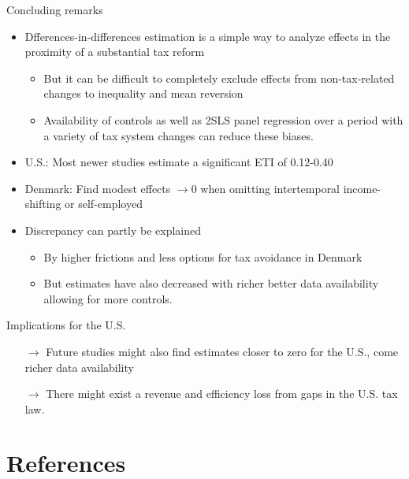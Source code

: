 \documentclass[8pt]{beamer}
\begin{document}
\begin{frame}{Concluding remarks}
  \begin{itemize}
    \item Dfferences-in-differences estimation is a simple way to analyze effects in the proximity of a substantial tax reform
    \begin{itemize}
      \item But it can be difficult to completely exclude effects from non-tax-related changes to inequality and mean reversion
      \item Availability of controls as well as 2SLS panel regression over a period with a variety of tax system changes can reduce these biases.
    \end{itemize}
    \item U.S.: Most newer studies estimate a significant ETI of 0.12-0.40
    \item Denmark: Find modest effects $\rightarrow 0$ when omitting intertemporal income-shifting or self-employed
    \item Discrepancy can partly be explained
    \begin{itemize}
      \item By higher frictions and less options for tax avoidance in Denmark
      \item But estimates have also decreased with richer better data availability allowing for more controls.
    \end{itemize}
  \end{itemize}
  Implications for the U.S.
  \begin{itemize}
    \item[$\rightarrow$] Future studies might also find estimates closer to zero for the U.S., come richer data availability
    \item[$\rightarrow$] There might exist a revenue and efficiency loss from gaps in the U.S. tax law.
  \end{itemize}



\end{frame}


\section{References}
\begin{frame}%
  \printbibliography
\end{frame}

\end{document}
